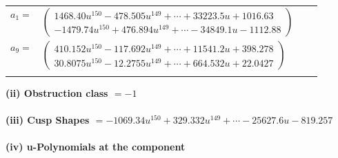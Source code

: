 \documentclass[1p]{elsarticle_modified}
\theoremstyle{definition}
\begin{document}
\begin{tabular}{m{7pt} m{180pt} m{7pt} m{180pt} }
\flushright $a_{1}=$&$\begin{pmatrix}1468.40 u^{150}-478.505 u^{149}+\cdots+33223.5 u+1016.63\\-1479.74 u^{150}+476.894 u^{149}+\cdots-34849.1 u-1112.88\end{pmatrix}$ \\
\flushright $a_{9}=$&$\begin{pmatrix}410.152 u^{150}-117.692 u^{149}+\cdots+11541.2 u+398.278\\30.8075 u^{150}-12.2755 u^{149}+\cdots+664.532 u+22.0427\end{pmatrix}$\\&\end{tabular}
\flushleft \textbf{(ii) Obstruction class $= -1$}\\~\\
\flushleft \textbf{(iii) Cusp Shapes $= -1069.34 u^{150}+329.332 u^{149}+\cdots-25627.6 u-819.257$}\\~\\
\newpage\renewcommand{\arraystretch}{1}
\flushleft \textbf{(iv) u-Polynomials at the component}\newline \\
\end{document}
